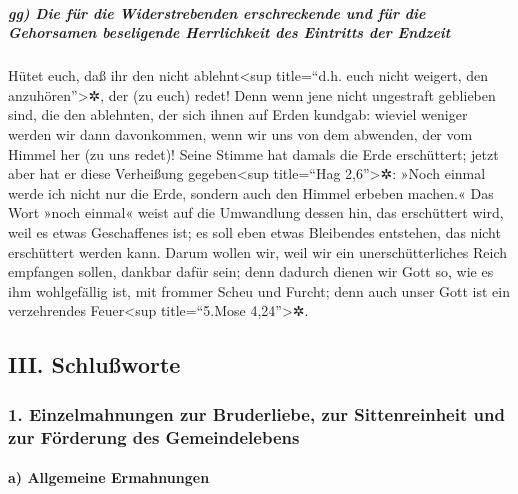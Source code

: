\hypertarget{gg-die-fuxfcr-die-widerstrebenden-erschreckende-und-fuxfcr-die-gehorsamen-beseligende-herrlichkeit-des-eintritts-der-endzeit}{%
\subparagraph{gg) Die für die Widerstrebenden erschreckende und für die
Gehorsamen beseligende Herrlichkeit des Eintritts der
Endzeit}\label{gg-die-fuxfcr-die-widerstrebenden-erschreckende-und-fuxfcr-die-gehorsamen-beseligende-herrlichkeit-des-eintritts-der-endzeit}}

 Hütet euch, daß ihr den nicht ablehnt\textless sup
title=``d.h. euch nicht weigert, den anzuhören''\textgreater✲, der (zu
euch) redet! Denn wenn jene nicht ungestraft geblieben sind, die den
ablehnten, der sich ihnen auf Erden kundgab: wieviel weniger werden wir
dann davonkommen, wenn wir uns von dem abwenden, der vom Himmel her (zu
uns redet)!  Seine Stimme hat damals die Erde
erschüttert; jetzt aber hat er diese Verheißung gegeben\textless sup
title=``Hag 2,6''\textgreater✲: »Noch einmal werde ich nicht nur die
Erde, sondern auch den Himmel erbeben machen.«  Das Wort
»noch einmal« weist auf die Umwandlung dessen hin, das erschüttert wird,
weil es etwas Geschaffenes ist; es soll eben etwas Bleibendes entstehen,
das nicht erschüttert werden kann.  Darum wollen wir,
weil wir ein unerschütterliches Reich empfangen sollen, dankbar dafür
sein; denn dadurch dienen wir Gott so, wie es ihm wohlgefällig ist, mit
frommer Scheu und Furcht;  denn auch unser Gott ist ein
verzehrendes Feuer\textless sup title=``5.Mose 4,24''\textgreater✲.

\hypertarget{iii.-schluuxdfworte}{%
\subsection{III. Schlußworte}\label{iii.-schluuxdfworte}}

\hypertarget{einzelmahnungen-zur-bruderliebe-zur-sittenreinheit-und-zur-fuxf6rderung-des-gemeindelebens}{%
\subsubsection{1. Einzelmahnungen zur Bruderliebe, zur Sittenreinheit
und zur Förderung des
Gemeindelebens}\label{einzelmahnungen-zur-bruderliebe-zur-sittenreinheit-und-zur-fuxf6rderung-des-gemeindelebens}}

\hypertarget{a-allgemeine-ermahnungen}{%
\paragraph{a) Allgemeine Ermahnungen}\label{a-allgemeine-ermahnungen}}

